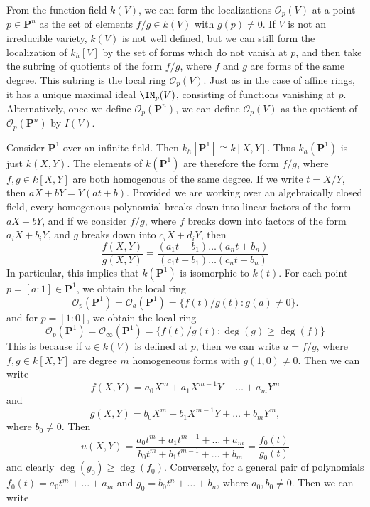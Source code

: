 From the function field $k(V)$, we can form the localizations $\mathcal{O}_p(V)$ at a point $p \in \mathbf{P}^n$ as the set of elements $f/g \in k(V)$ with $g(p) \neq 0$. If $V$ is not an irreducible variety, $k(V)$ is not well defined, but we can still form the localization of $k_h[V]$ by the set of forms which do not vanish at $p$, and then take the subring of quotients of the form $f/g$, where $f$ and $g$ are forms of the same degree. This subring is the local ring $\mathcal{O}_p(V)$. Just as in the case of affine rings, it has a unique maximal ideal $\IM_p(V)$, consisting of functions vanishing at $p$. Alternatively, once we define $\mathcal{O}_p(\mathbf{P}^n)$, we can define $\mathcal{O}_p(V)$ as the quotient of $\mathcal{O}_p(\mathbf{P}^n)$ by $I(V)$.

\begin{example}
    Consider $\mathbf{P}^1$ over an infinite field. Then $k_h[\mathbf{P}^1] \cong k[X,Y]$. Thus $k_h(\mathbf{P}^1)$ is just $k(X,Y)$. The elements of $k(\mathbf{P}^1)$ are therefore the form $f/g$, where $f,g \in k[X,Y]$ are both homogenous of the same degree. If we write $t = X/Y$, then $aX + bY = Y(at + b)$. Provided we are working over an algebraically closed field, every homogenous polynomial breaks down into linear factors of the form $aX + bY$, and if we consider $f/g$, where $f$ breaks down into factors of the form $a_iX + b_iY$, and $g$ breaks down into $c_iX + d_iY$, then
    \[ \frac{f(X,Y)}{g(X,Y)} = \frac{(a_1t + b_1) \dots (a_nt + b_n)}{(c_1t + b_1) \dots (c_nt + b_n)} \]
    In particular, this implies that $k(\mathbf{P}^1)$ is isomorphic to $k(t)$. For each point $p = [a:1] \in \mathbf{P}^1$, we obtain the local ring
    \[ \mathcal{O}_p(\mathbf{P}^1) = \mathcal{O}_a(\mathbf{P}^1) = \{ f(t)/g(t) : g(a) \neq 0 \}. \]
    and for $p = [1:0]$, we obtain the local ring
    \[ \mathcal{O}_p(\mathbf{P}^1) = \mathcal{O}_\infty(\mathbf{P}^1) = \{  f(t)/g(t) : \deg(g) \geq \deg(f) \} \]
    This is because if $u \in k(V)$ is defined at $p$, then we can write $u = f/g$, where $f,g \in k[X,Y]$ are degree $m$ homogeneous forms with $g(1,0) \neq 0$. Then we can write
    \[ f(X,Y) = a_0X^m + a_1X^{m-1}Y + \dots + a_m Y^m \]
    and
    \[ g(X,Y) = b_0X^m + b_1X^{m-1}Y + \dots + b_m Y^m, \]
    where $b_0 \neq 0$. Then
    \[ u(X,Y) = \frac{a_0 t^m + a_1 t^{m-1} + \dots + a_m}{b_0 t^m + b_1 t^{m-1} + \dots + b_m} = \frac{f_0(t)}{g_0(t)} \]
    and clearly $\deg(g_0) \geq \deg(f_0)$. Conversely, for a general pair of polynomials $f_0(t) = a_0 t^m + \dots + a_m$ and $g_0 = b_0 t^n + \dots + b_n$, where $a_0,b_0 \neq 0$. Then we can write

\end{example}
